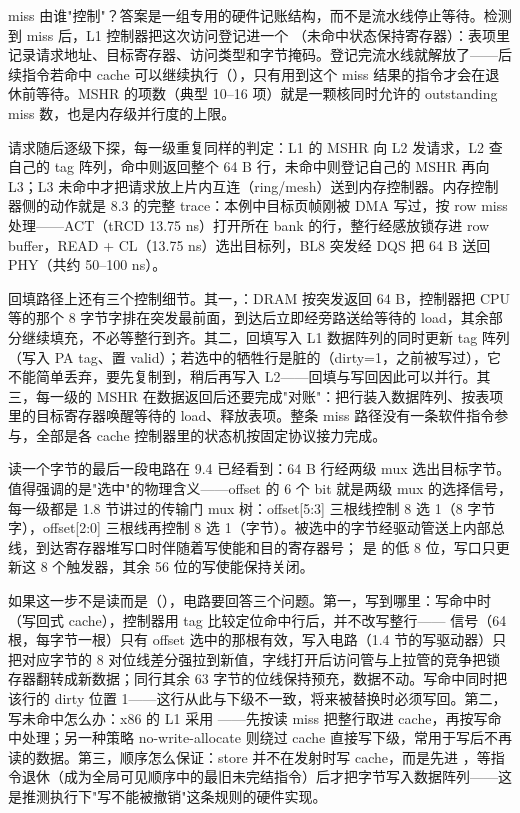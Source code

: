 
miss 由谁"控制"？答案是一组专用的硬件记账结构，而不是流水线停止等待。检测到 miss 后，L1 控制器把这次访问登记进一个 （未命中状态保持寄存器）：表项里记录请求地址、目标寄存器、访问类型和字节掩码。登记完流水线就解放了——后续指令若命中 cache 可以继续执行（），只有用到这个 miss 结果的指令才会在退休前等待。MSHR 的项数（典型 10--16 项）就是一颗核同时允许的 outstanding miss 数，也是内存级并行度的上限。

请求随后逐级下探，每一级重复同样的判定：L1 的 MSHR 向 L2 发请求，L2 查自己的 tag 阵列，命中则返回整个 64 B 行，未命中则登记自己的 MSHR 再向 L3；L3 未命中才把请求放上片内互连（ring/mesh）送到内存控制器。内存控制器侧的动作就是 8.3 的完整 trace：本例中目标页帧刚被 DMA 写过，按 row miss 处理——ACT（tRCD 13.75 ns）打开所在 bank 的行，整行经感放锁存进 row buffer，READ + CL（13.75 ns）选出目标列，BL8 突发经 DQS 把 64 B 送回 PHY（共约 50--100 ns）。

回填路径上还有三个控制细节。其一，：DRAM 按突发返回 64 B，控制器把 CPU 等的那个 8 字节字排在突发最前面，到达后立即经旁路送给等待的 load，其余部分继续填充，不必等整行到齐。其二，回填写入 L1 数据阵列的同时更新 tag 阵列（写入 PA tag、置 valid）；若选中的牺牲行是脏的（dirty=1，之前被写过），它不能简单丢弃，要先复制到，稍后再写入 L2——回填与写回因此可以并行。其三，每一级的 MSHR 在数据返回后还要完成"对账"：把行装入数据阵列、按表项里的目标寄存器唤醒等待的 load、释放表项。整条 miss 路径没有一条软件指令参与，全部是各 cache 控制器里的状态机按固定协议接力完成。


读一个字节的最后一段电路在 9.4 已经看到：64 B 行经两级 mux 选出目标字节。值得强调的是"选中"的物理含义——offset 的 6 个 bit 就是两级 mux 的选择信号，每一级都是 1.8 节讲过的传输门 mux 树：offset[5:3] 三根线控制 8 选 1（8 字节字），offset[2:0] 三根线再控制 8 选 1（字节）。被选中的字节经驱动管送上内部总线，到达寄存器堆写口时伴随着写使能和目的寄存器号； 是  的低 8 位，写口只更新这 8 个触发器，其余 56 位的写使能保持关闭。

如果这一步不是读而是（），电路要回答三个问题。第一，写到哪里：写命中时（写回式 cache），控制器用 tag 比较定位命中行后，并不改写整行—— 信号（64 根，每字节一根）只有 offset 选中的那根有效，写入电路（1.4 节的写驱动器）只把对应字节的 8 对位线差分强拉到新值，字线打开后访问管与上拉管的竞争把锁存器翻转成新数据；同行其余 63 字节的位线保持预充，数据不动。写命中同时把该行的 dirty 位置 1——这行从此与下级不一致，将来被替换时必须写回。第二，写未命中怎么办：x86 的 L1 采用 ——先按读 miss 把整行取进 cache，再按写命中处理；另一种策略 no-write-allocate 则绕过 cache 直接写下级，常用于写后不再读的数据。第三，顺序怎么保证：store 并不在发射时写 cache，而是先进 ，等指令退休（成为全局可见顺序中的最旧未完结指令）后才把字节写入数据阵列——这是推测执行下"写不能被撤销"这条规则的硬件实现。

